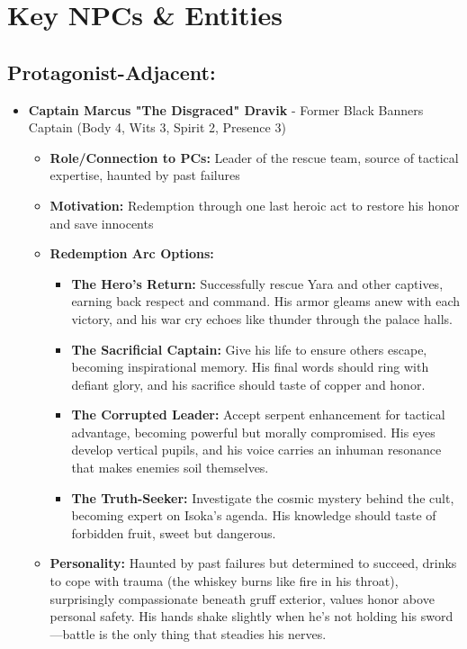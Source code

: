 \documentclass[11pt]{article}
\begin{document}
\section{Key NPCs \& Entities}

\subsection{Protagonist-Adjacent:}
\begin{itemize}
\item \textbf{Captain Marcus "The Disgraced" Dravik} - Former Black Banners Captain (Body 4, Wits 3, Spirit 2, Presence 3)
  \begin{itemize}
  \item \textbf{Role/Connection to PCs:} Leader of the rescue team, source of tactical expertise, haunted by past failures
  \item \textbf{Motivation:} Redemption through one last heroic act to restore his honor and save innocents
  \item \textbf{Redemption Arc Options:}
    \begin{itemize}
    \item \textbf{The Hero's Return:} Successfully rescue Yara and other captives, earning back respect and command. His armor gleams anew with each victory, and his war cry echoes like thunder through the palace halls.
    \item \textbf{The Sacrificial Captain:} Give his life to ensure others escape, becoming inspirational memory. His final words should ring with defiant glory, and his sacrifice should taste of copper and honor.
    \item \textbf{The Corrupted Leader:} Accept serpent enhancement for tactical advantage, becoming powerful but morally compromised. His eyes develop vertical pupils, and his voice carries an inhuman resonance that makes enemies soil themselves.
    \item \textbf{The Truth-Seeker:} Investigate the cosmic mystery behind the cult, becoming expert on Isoka's agenda. His knowledge should taste of forbidden fruit, sweet but dangerous.
    \end{itemize}
  \item \textbf{Personality:} Haunted by past failures but determined to succeed, drinks to cope with trauma (the whiskey burns like fire in his throat), surprisingly compassionate beneath gruff exterior, values honor above personal safety. His hands shake slightly when he's not holding his sword—battle is the only thing that steadies his nerves.

\end{itemize}
\end{itemize}
\end{document}
